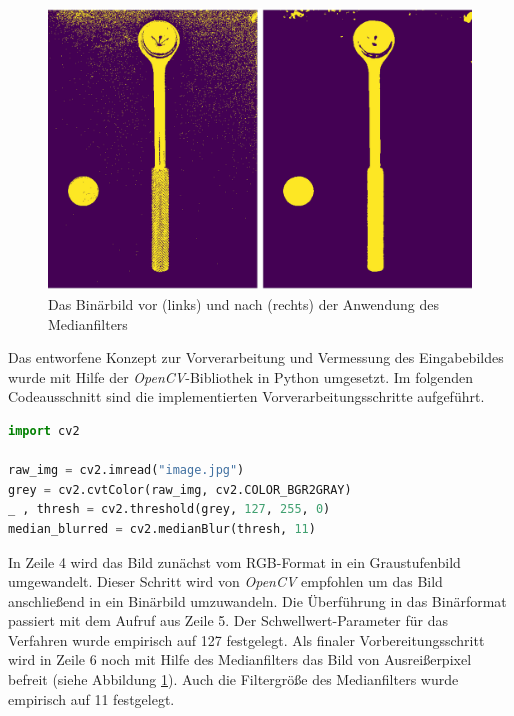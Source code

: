\documentclass[twocolumn,10pt]{asme2ej}
\begin{document}
\begin{figure}
	\includegraphics[scale=0.2]{blurr}
	\caption[center]{Das Binärbild vor (links) und nach (rechts) der Anwendung des Medianfilters}
	\label{fig:blurr}
\end{figure}

Das entworfene Konzept zur Vorverarbeitung und Vermessung des Eingabebildes wurde mit Hilfe der \emph{OpenCV}-Bibliothek in Python umgesetzt. Im folgenden Codeausschnitt sind die implementierten Vorverarbeitungsschritte aufgeführt.

\begin{lstlisting}[language=Python, caption=Vorverarbeitung]
import cv2

raw_img = cv2.imread("image.jpg")
grey = cv2.cvtColor(raw_img, cv2.COLOR_BGR2GRAY)
_ , thresh = cv2.threshold(grey, 127, 255, 0)
median_blurred = cv2.medianBlur(thresh, 11)

\end{lstlisting}
In Zeile 4 wird das Bild zunächst vom RGB-Format in ein Graustufenbild umgewandelt. Dieser Schritt wird von  \emph{OpenCV} empfohlen um das Bild anschließend in ein Binärbild umzuwandeln. Die Überführung in das Binärformat passiert mit dem Aufruf aus Zeile 5. Der Schwellwert-Parameter für das Verfahren wurde empirisch auf 127 festgelegt. Als finaler Vorbereitungsschritt wird in Zeile 6 noch mit Hilfe des Medianfilters das Bild von Ausreißerpixel befreit (siehe Abbildung \ref{fig:blurr}). Auch die Filtergröße des Medianfilters wurde empirisch auf 11 festgelegt.
\end{document}
